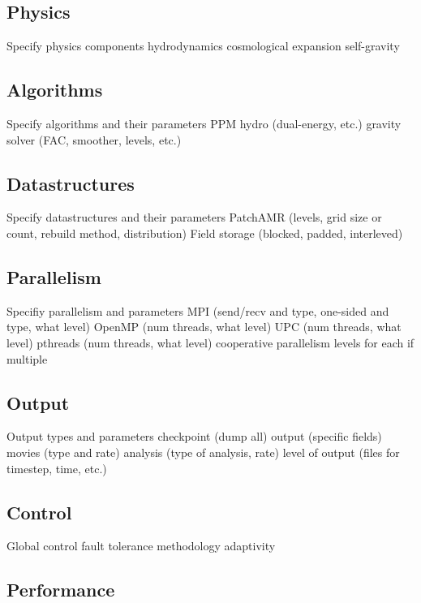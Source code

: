 \documentclass{article}
\begin{document}
\subsection{Physics}

 Specify physics components
 hydrodynamics
  cosmological expansion
 self-gravity

\subsection{Algorithms} 

Specify algorithms and their parameters
 PPM hydro (dual-energy, etc.)
 gravity solver (FAC, smoother, levels, etc.)

\subsection{Datastructures} 

Specify datastructures and their parameters
 PatchAMR (levels, grid size or count, rebuild method, distribution)
 Field storage (blocked, padded, interleved)

\subsection{Parallelism} 

Specifiy parallelism and parameters
 MPI (send/recv and type, one-sided and type, what level)
 OpenMP (num threads, what level)
 UPC (num threads, what level)
 pthreads (num threads, what level)
 cooperative parallelism
 levels for each if multiple

\subsection{Output} 

Output types and parameters
 checkpoint (dump all)
 output (specific fields)
 movies (type and rate)
 analysis (type of analysis, rate)
 level of output (files for timestep, time, etc.)

\subsection{Control} 

Global control
 fault tolerance methodology
 adaptivity

\subsection{Performance} 
\end{document}
